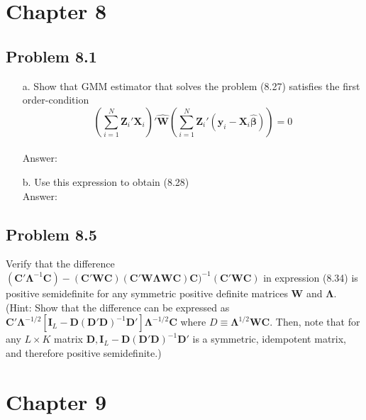 \documentclass[10pt]{article}
\begin{document}
\section*{Chapter 8}
\subsection*{Problem 8.1}
\begin{enumerate}
\item[a.] Show that GMM estimator that solves the problem (8.27) satisfies the first order-condition
\[\left(\sum_{i=1}^N \textbf{Z}_i'\textbf{X}_i\right)'\hat{\textbf{W}}\left(\sum_{i=1}^N \textbf{Z}_i'(\textbf{y}_i-\textbf{X}_i \hat{\pmb{\beta}})\right)=0\]
\\ Answer: \\

\item[b.] Use this expression to obtain (8.28)
\\ Answer: \\

\end{enumerate}
\subsection*{Problem 8.5}
Verify that the difference $(\textbf{C}'\pmb{\Lambda}^{-1}\textbf{C})-(\textbf{C}'\textbf{W}\textbf{C})(\textbf{C}'\textbf{W}\pmb{\Lambda}\textbf{W}\textbf{C})\textbf{C})^{-1}(\textbf{C}'\textbf{W}\textbf{C})$ in expression (8.34) is positive semidefinite for any symmetric positive definite matrices $\textbf{W}$ and $\pmb{\Lambda}$. (Hint: Show that the difference can be expressed as $\textbf{C}'\pmb{\Lambda}^{-1/2}[\textbf{I}_L-\textbf{D}(\textbf{D}'\textbf{D})^{-1}\textbf{D}']\pmb{\Lambda}^{-1/2}\textbf{C}$ where $D\equiv\pmb{\Lambda}^{1/2}\textbf{WC}.$ Then, note that for any $L\times K$ matrix $\textbf{D},\textbf{I}_L-\textbf{D}(\textbf{D}'\textbf{D})^{-1}\textbf{D}'$ is a symmetric, idempotent matrix, and therefore positive semidefinite.)

\section*{Chapter 9}
\end{document}
